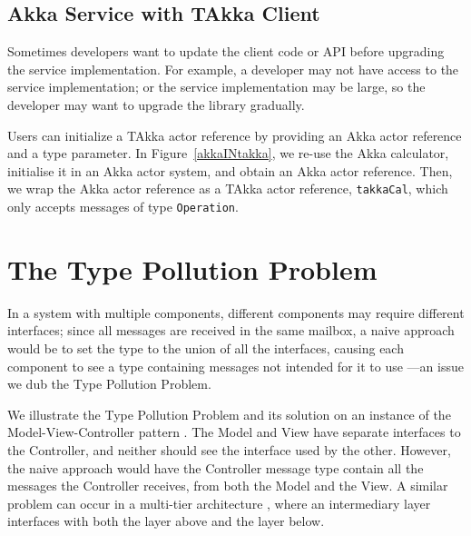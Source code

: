 \subsection{Akka Service with TAkka Client}



Sometimes developers want to update the client code or API before 
upgrading the service implementation. For example, a developer may not have access to 
the service implementation; or the service implementation may be large, so the 
developer may want to upgrade the library gradually.

Users can initialize a TAkka actor reference by providing an Akka actor 
reference and a type parameter.  In Figure~\ref{akkaINtakka}, we re-use the 
Akka calculator, initialise it in an Akka actor system, and obtain an Akka 
actor reference.  Then, we wrap the Akka actor reference as a TAkka 
actor reference, {\tt takkaCal}, which only accepts messages of type
{\tt Operation}.


\section{The Type Pollution Problem}
\label{type_pollution}


In a system with multiple components, different components may require
different interfaces; since all messages are received in the same
mailbox, a naive approach would be to set the type to the union of all
the interfaces, causing each component to see a type containing
messages not intended for it to use ---an issue we dub the Type Pollution
Problem.

We illustrate the Type Pollution Problem and its solution on an
instance of the Model-View-Controller pattern \cite{burbeck87}.  The Model
and View have separate interfaces to the Controller, and neither
should see the interface used by the other.  However, the naive
approach would have the Controller message type contain all the
messages the Controller receives, from both the Model and the View.
A similar problem can occur in a multi-tier architecture \cite{fowler2002patterns},
where an intermediary layer interfaces with both the layer above
and the layer below.


